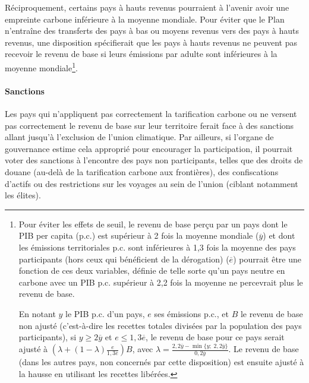 \documentclass[a5paper,french,openany]{memoir}
\begin{document}
Réciproquement, certains pays à hauts revenus pourraient à l'avenir avoir une empreinte carbone inférieure à la moyenne mondiale. %
Pour éviter que le Plan n'entraîne des transferts des pays à bas ou moyens revenus vers des pays à hauts revenus, une disposition spécifierait que les pays à hauts revenus ne peuvent pas recevoir le revenu de base si leurs émissions par adulte sont inférieures à la moyenne mondiale\footnote{Pour éviter les effets de seuil, le revenu de base perçu par un pays dont le PIB per capita (p.c.) est supérieur à 2 fois la moyenne mondiale ($\overline{y}$) et dont les émissions territoriales p.c. sont inférieures à 1,3 fois la moyenne des pays participants (hors ceux qui bénéficient de la dérogation) ($\overline{e}$) pourrait être une fonction de ces deux variables, définie de telle sorte qu'un pays neutre en carbone avec un PIB p.c. supérieur à 2,2 fois la moyenne ne percevrait plus le revenu de base. 

En notant $y$ le PIB p.c. d'un pays, $e$ ses émissions p.c., et $B$ le revenu de base non ajusté (c'est-à-dire les recettes totales divisées par la population des pays participants), si $y\geq 2\overline{y}$ et $e \leq 1,3 \overline{e}$, le revenu de base pour ce pays serait ajusté à $\left(\lambda + \left(1-\lambda \right) \frac{e}{1,3\overline{e}} \right) B$, avec $\lambda = \frac{2,2\overline{y}-\min\{y;\;2,2\overline{y}\}}{0,2\overline{y}}$. 
Le revenu de base (dans les autres pays, non concernés par cette disposition) est ensuite ajusté à la hausse en utilisant les recettes libérées.}. 

\paragraph{Sanctions}

Les pays qui n'appliquent pas correctement la tarification carbone ou ne versent pas correctement le revenu de base sur leur territoire ferait face à des sanctions allant jusqu'à l'exclusion de l'union climatique. 
Par ailleurs, si l'organe de gouvernance estime cela approprié pour encourager la participation, il pourrait voter des sanctions à l'encontre des pays non participants, telles que des droits de douane (au-delà de la tarification carbone aux frontières), des confiscations d'actifs ou des restrictions sur les voyages au sein de l'union (ciblant notamment les élites). 
\end{document}
